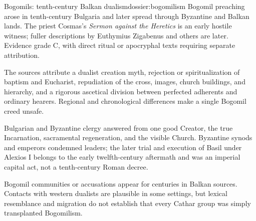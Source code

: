 \begin{heresydossier}{Bogomils: tenth-century Balkan dualism}{dossier:bogomilism}
\objectfield Bogomil preaching arose in tenth-century Bulgaria and later spread through Byzantine and Balkan lands. The priest Cosmas's \emph{Sermon against the Heretics} is an early hostile witness; fuller descriptions by Euthymius Zigabenus and others are later. Evidence grade C, with direct ritual or apocryphal texts requiring separate attribution.

\propositionfield The sources attribute a dualist creation myth, rejection or spiritualization of baptism and Eucharist, repudiation of the cross, images, church buildings, and hierarchy, and a rigorous ascetical division between perfected adherents and ordinary hearers. Regional and chronological differences make a single Bogomil creed unsafe.

\responsefield Bulgarian and Byzantine clergy answered from one good Creator, the true Incarnation, sacramental regeneration, and the visible Church. Byzantine synods and emperors condemned leaders; the later trial and execution of Basil under Alexios I belongs to the early twelfth-century aftermath and was an imperial capital act, not a tenth-century Roman decree.

\aftermathfield Bogomil communities or accusations appear for centuries in Balkan sources. Contacts with western dualists are plausible in some settings, but lexical resemblance and migration do not establish that every Cathar group was simply transplanted Bogomilism.
\end{heresydossier}
